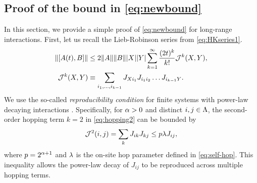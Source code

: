 \subsection{Proof of the bound in \cref{eq:newbound}}
\label{sec:newbound}

In this section, we provide a simple proof of \cref{eq:newbound} for long-range interactions.
First, let us recall the Lieb-Robinson series from \cref{eq:HKseries1}.
\begin{align}
	\label{eq:HKseries2}
		\|[A(t),B]\| &\le 2\|A\|\|B\||X||Y|\sum_{k=1}^{\infty}\frac{(2t)^{k}}{k!} \mathcal{J}^k(X,Y), \\
	\label{eq:hopping2}
	\mathcal{J}^k(X,Y) &\equiv \sum_{i_{1},\dots,i_{k-1}}J_{Xi_{1}}J_{i_{1}i_{2}}\dots J_{i_{k-1}Y}.
\end{align}
We use the so-called \emph{reproducibility condition} for finite systems with power-law decaying interactions \cite{HK, Gong14}. Specifically, for $\alpha > 0$ and distinct $i,j\in \Lambda$, the second-order hopping term $k=2$ in \cref{eq:hopping2} can be bounded by
\begin{equation}
	\label{eq:repcon}
	\mathcal{J}^2(i,j) = \sum_k J_{ik}J_{kj} \le p\lambda J_{ij},
\end{equation}
where $p=2^{\alpha+1}$ and $\lambda$ is the on-site hop parameter defined in \cref{eq:self-hop}.
This inequality allows the power-law decay of $J_{ij}$ to be reproduced across multiple hopping terms.

